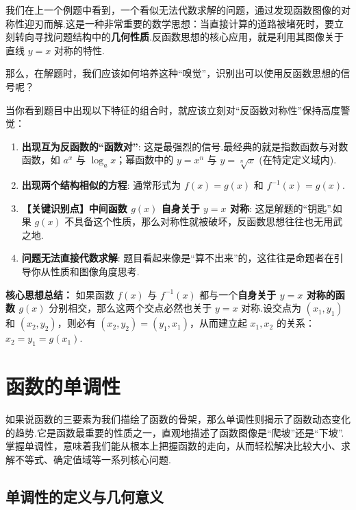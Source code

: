 我们在上一个例题中看到，一个看似无法代数求解的问题，通过发现函数图像的对称性迎刃而解.这是一种非常重要的数学思想：当直接计算的道路被堵死时，要立刻转向寻找问题结构中的\textbf{几何性质}.反函数思想的核心应用，就是利用其图像关于直线 $y=x$ 对称的特性.

那么，在解题时，我们应该如何培养这种“嗅觉”，识别出可以使用反函数思想的信号呢？

\begin{note}[何时要想到反函数]
	当你看到题目中出现以下特征的组合时，就应该立刻对“反函数对称性”保持高度警觉：
	\begin{enumerate}
		\item \textbf{出现互为反函数的“函数对”}: 这是最强烈的信号.最经典的就是指数函数与对数函数，如 $a^x$ 与 $\log_a x$；幂函数中的 $y=x^n$ 与 $y=\sqrt[n]{x}$ (在特定定义域内).
		\item \textbf{出现两个结构相似的方程}: 通常形式为 $f(x)=g(x)$ 和 $f^{-1}(x)=g(x)$.
		\item \textbf{【关键识别点】中间函数 $g(x)$ 自身关于 $y=x$ 对称}: 这是解题的“钥匙”.如果 $g(x)$ 不具备这个性质，那么对称性就被破坏，反函数思想往往也无用武之地.
		\item \textbf{问题无法直接代数求解}: 题目看起来像是“算不出来”的，这往往是命题者在引导你从性质和图像角度思考.
	\end{enumerate}
	\textbf{核心思想总结：} 如果函数 $f(x)$ 与 $f^{-1}(x)$ 都与一个\textbf{自身关于 $y=x$ 对称的函数 $g(x)$} 分别相交，那么这两个交点必然也关于 $y=x$ 对称.设交点为 $(x_1, y_1)$ 和 $(x_2, y_2)$，则必有 $(x_2, y_2)=(y_1, x_1)$，从而建立起 $x_1, x_2$ 的关系：$x_2 = y_1 = g(x_1)$.
\end{note}


\section{函数的单调性}

如果说函数的三要素为我们描绘了函数的骨架，那么单调性则揭示了函数动态变化的趋势.它是函数最重要的性质之一，直观地描述了函数图像是“爬坡”还是“下坡”.掌握单调性，意味着我们能从根本上把握函数的走向，从而轻松解决比较大小、求解不等式、确定值域等一系列核心问题.


\subsection{单调性的定义与几何意义}

